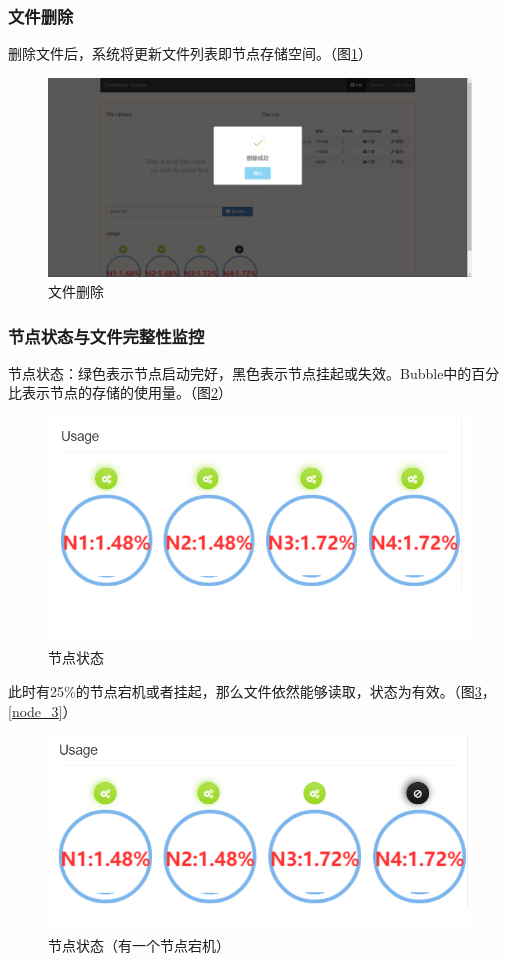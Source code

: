 \documentclass[12pt,a4paper]{article}
\begin{document}
\subsubsection{文件删除}
删除文件后，系统将更新文件列表即节点存储空间。（图\ref{delete_1}）
\begin{figure}[htb]
\centering
\includegraphics[width=14cm]{delete_1}
\caption{文件删除 \label{delete_1}}
\end{figure}

\subsubsection{节点状态与文件完整性监控}
节点状态：绿色表示节点启动完好，黑色表示节点挂起或失效。Bubble中的百分比表示节点的存储的使用量。（图\ref{node_1}）
\begin{figure}[htb]
\centering
\includegraphics[width=14cm]{node_1}
\caption{节点状态 \label{node_1}}
\end{figure}

此时有25\%的节点宕机或者挂起，那么文件依然能够读取，状态为有效。（图\ref{node_2}，\ref{node_3}）
\begin{figure}[htb]
\centering
\includegraphics[width=14cm]{node_2}
\caption{节点状态（有一个节点宕机） \label{node_2}}
\end{figure}
\end{document}
